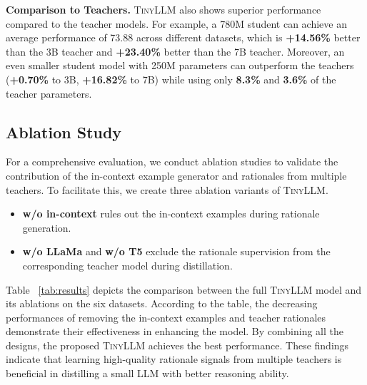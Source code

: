 \documentclass[sigconf,nonacm]{acmart}
\newcommand{\ours}{\textsc{TinyLLM}\xspace}
\begin{document}
\noindent \textbf{Comparison to Teachers.} 
\ours also shows superior performance compared to the teacher models. For example, a 780M student can achieve an average performance of 73.88 across different datasets, which is \textbf{+14.56\%} better than the 3B teacher and \textbf{+23.40\%} better than the 7B teacher. Moreover, an even smaller student model with 250M parameters can outperform the teachers (\textbf{+0.70\%} to 3B, \textbf{+16.82\%} to 7B) while using only \textbf{8.3\%} and \textbf{3.6\%} of the teacher parameters.


\vspace{-0.05in}
\subsection{Ablation Study}
For a comprehensive evaluation, we conduct ablation studies to validate the contribution of the in-context example generator and rationales from multiple teachers. To facilitate this, we create three ablation variants of \ours. 
\begin{itemize}[leftmargin=*]
    \item \textbf{w/o in-context} rules out the in-context examples during rationale generation.
    \item \textbf{w/o LLaMa} and \textbf{w/o T5} exclude the rationale supervision from the corresponding teacher model during distillation.
\end{itemize}
Table ~\ref{tab:results} depicts the comparison between the full \ours model and its ablations on the six datasets. According to the table, the decreasing performances of removing the in-context examples and teacher rationales demonstrate their effectiveness in enhancing the model. By combining all the designs, the proposed \ours achieves the best performance. These findings indicate that learning high-quality rationale signals from multiple teachers is beneficial in distilling a small LLM with better reasoning ability.
\end{document}
